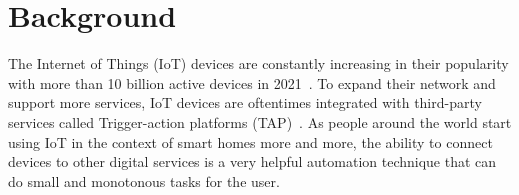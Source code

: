 \section{Background}
\label{sec:background}

The Internet of Things (IoT) devices are constantly increasing in their popularity with more than 10 billion
active devices in 2021~\cite{DBLP:webpage/Bojan/IoTstats}. To expand their network and support more
services, IoT devices are oftentimes integrated with third-party services called Trigger-action platforms
(TAP)~\cite{DBLP:journals/access/XuZZCDG19}. As people around the world start using IoT in the
context of smart homes more and more, the ability to connect devices to other digital services is a very helpful automation technique that can do small and monotonous tasks for the user. 